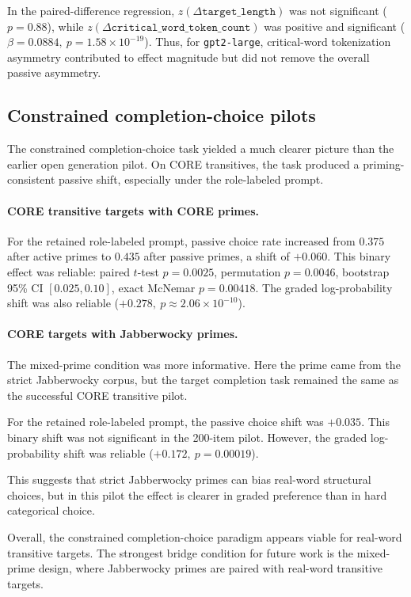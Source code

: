 \documentclass[11pt]{article}
\begin{document}
In the paired-difference regression, \(z(\Delta\texttt{target\_length})\) was
not significant (\(p=0.88\)), while
\(z(\Delta\texttt{critical\_word\_token\_count})\) was positive and significant
(\(\beta=0.0884,\ p=1.58\times10^{-19}\)). Thus, for
\texttt{gpt2-large}, critical-word tokenization asymmetry contributed to effect
magnitude but did not remove the overall passive asymmetry.

\subsection*{Constrained completion-choice pilots}

The constrained completion-choice task yielded a much clearer picture than the
earlier open generation pilot. On CORE transitives, the task produced a
priming-consistent passive shift, especially under the role-labeled prompt.

\paragraph{CORE transitive targets with CORE primes.}
For the retained role-labeled prompt, passive choice rate increased from
\(0.375\) after active primes to \(0.435\) after passive primes, a shift of
\(+0.060\). This binary effect was reliable: paired \(t\)-test \(p=0.0025\),
permutation \(p=0.0046\), bootstrap 95\% CI \([0.025, 0.10]\), exact McNemar
\(p=0.00418\). The graded log-probability shift was also reliable
(\(+0.278,\ p\approx 2.06\times10^{-10}\)).

\paragraph{CORE targets with Jabberwocky primes.}
The mixed-prime condition was more informative. Here the prime came from the
strict Jabberwocky corpus, but the target completion task remained the same as
the successful CORE transitive pilot.

For the retained role-labeled prompt, the passive choice shift was \(+0.035\).
This binary shift was not significant in the 200-item pilot. However, the
graded log-probability shift was reliable (\(+0.172,\ p=0.00019\)).

This suggests that strict Jabberwocky primes can bias real-word structural
choices, but in this pilot the effect is clearer in graded preference than in
hard categorical choice.

Overall, the constrained completion-choice paradigm appears viable for
real-word transitive targets. The strongest bridge condition for future work is
the mixed-prime design, where Jabberwocky primes are paired with real-word
transitive targets.
\end{document}
